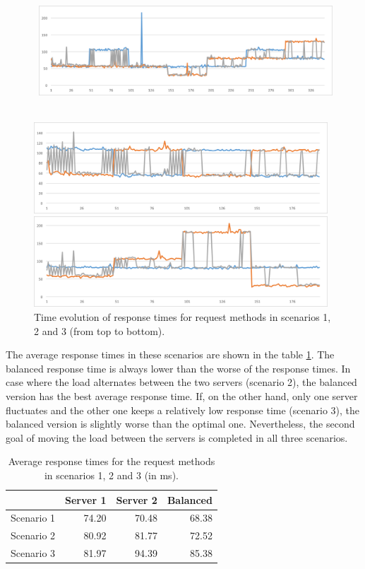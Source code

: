 \begin{figure}[h!]
	\captionsetup{justification=centering,margin=0.5cm}
	\centerline{
		\mbox{
			\includegraphics[width=110mm]{./img/load_balance_scen1.png}
		}
	}
	\centerline{
		\mbox{\includegraphics[width=110mm]{./img/load_balance_scen2.png}}
	}
	\centerline{
		\mbox{\includegraphics[width=110mm]{./img/load_balance_scen3.png}}
	}
	\caption{Time evolution of response times for request methods in scenarios 1, 2 and 3 (from top to bottom).}
	\label{fig:load_balance_scen}
\end{figure}

The average response times in these scenarios are shown in the table \ref{tab:load_balance_resp_avgs}. The balanced response time is always lower than the worse of the response times. In case where the load alternates between the two servers (scenario 2), the balanced version has the best average response time. If, on the other hand, only one server fluctuates and the other one keeps a relatively low response time (scenario 3), the balanced version is slightly worse than the optimal one. Nevertheless, the second goal of moving the load between the servers is completed in all three scenarios.

\begin{table}[h!]
	\centering
	\captionsetup{justification=centering,margin=0.5cm}
		\bgroup
	\def\arraystretch{1.5}%
	
	\begin{tabular}{|l|r|r|r|}
		\hline
		& \textbf{Server 1}& \textbf{Server 2}& \textbf{Balanced}\\ \hline
		Scenario 1 & 74.20             & 70.48             & 68.38             \\ \hline
		Scenario 2 & 80.92             & 81.77             & 72.52             \\ \hline
		Scenario 3 & 81.97             & 94.39             & 85.38             \\ \hline
	\end{tabular}
	\egroup
	\caption{Average response times for the request methods in scenarios 1, 2 and 3 (in ms).}
\label{tab:load_balance_resp_avgs}
\end{table}

